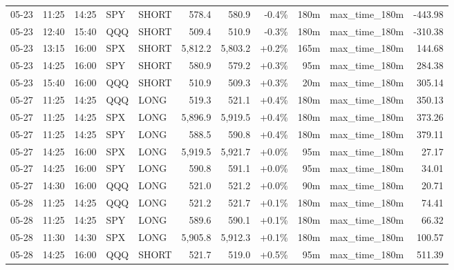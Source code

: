 \documentclass[11pt,a4paper,twoside]{article}
\begin{document}
\begin{center}
\begin{longtable}{>{\color{txtmain}}l l l l l r r r r >{\color{txtmain}}l r}
05-23 & 11:25 & 14:25 & SPY & SHORT & 578.4 & 580.9 & \textcolor{lossred}{-0.4\%} & 180m & max\_time\_180m & \textcolor{lossred}{-443.98} \\
05-23 & 12:40 & 15:40 & QQQ & SHORT & 509.4 & 510.9 & \textcolor{lossred}{-0.3\%} & 180m & max\_time\_180m & \textcolor{lossred}{-310.38} \\
05-23 & 13:15 & 16:00 & SPX & SHORT & 5,812.2 & 5,803.2 & \textcolor{wingreen}{+0.2\%} & 165m & max\_time\_180m & \textcolor{wingreen}{144.68} \\
05-23 & 14:25 & 16:00 & SPY & SHORT & 580.9 & 579.2 & \textcolor{wingreen}{+0.3\%} & 95m & max\_time\_180m & \textcolor{wingreen}{284.38} \\
05-23 & 15:40 & 16:00 & QQQ & SHORT & 510.9 & 509.3 & \textcolor{wingreen}{+0.3\%} & 20m & max\_time\_180m & \textcolor{wingreen}{305.14} \\
05-27 & 11:25 & 14:25 & QQQ & LONG & 519.3 & 521.1 & \textcolor{wingreen}{+0.4\%} & 180m & max\_time\_180m & \textcolor{wingreen}{350.13} \\
05-27 & 11:25 & 14:25 & SPX & LONG & 5,896.9 & 5,919.5 & \textcolor{wingreen}{+0.4\%} & 180m & max\_time\_180m & \textcolor{wingreen}{373.26} \\
05-27 & 11:25 & 14:25 & SPY & LONG & 588.5 & 590.8 & \textcolor{wingreen}{+0.4\%} & 180m & max\_time\_180m & \textcolor{wingreen}{379.11} \\
05-27 & 14:25 & 16:00 & SPX & LONG & 5,919.5 & 5,921.7 & \textcolor{wingreen}{+0.0\%} & 95m & max\_time\_180m & \textcolor{wingreen}{27.17} \\
05-27 & 14:25 & 16:00 & SPY & LONG & 590.8 & 591.1 & \textcolor{wingreen}{+0.0\%} & 95m & max\_time\_180m & \textcolor{wingreen}{34.01} \\
05-27 & 14:30 & 16:00 & QQQ & LONG & 521.0 & 521.2 & \textcolor{wingreen}{+0.0\%} & 90m & max\_time\_180m & \textcolor{wingreen}{20.71} \\
05-28 & 11:25 & 14:25 & QQQ & LONG & 521.2 & 521.7 & \textcolor{wingreen}{+0.1\%} & 180m & max\_time\_180m & \textcolor{wingreen}{74.41} \\
05-28 & 11:25 & 14:25 & SPY & LONG & 589.6 & 590.1 & \textcolor{wingreen}{+0.1\%} & 180m & max\_time\_180m & \textcolor{wingreen}{66.32} \\
05-28 & 11:30 & 14:30 & SPX & LONG & 5,905.8 & 5,912.3 & \textcolor{wingreen}{+0.1\%} & 180m & max\_time\_180m & \textcolor{wingreen}{100.57} \\
05-28 & 14:25 & 16:00 & QQQ & SHORT & 521.7 & 519.0 & \textcolor{wingreen}{+0.5\%} & 95m & max\_time\_180m & \textcolor{wingreen}{511.39} \\

\end{longtable}
\end{center}
\end{document}
